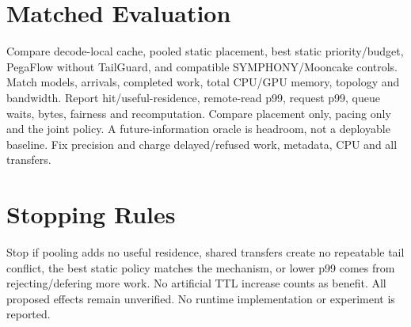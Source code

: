 \documentclass[conference]{IEEEtran}
\begin{document}
\section{Matched Evaluation}
Compare decode-local cache, pooled static placement, best static priority/budget, PegaFlow without TailGuard, and compatible SYMPHONY/Mooncake controls. Match models, arrivals, completed work, total CPU/GPU memory, topology and bandwidth. Report hit/useful-residence, remote-read p99, request p99, queue waits, bytes, fairness and recomputation. Compare placement only, pacing only and the joint policy. A future-information oracle is headroom, not a deployable baseline. Fix precision and charge delayed/refused work, metadata, CPU and all transfers.
\section{Stopping Rules}
Stop if pooling adds no useful residence, shared transfers create no repeatable tail conflict, the best static policy matches the mechanism, or lower p99 comes from rejecting/defering more work. No artificial TTL increase counts as benefit. All proposed effects remain unverified. No runtime implementation or experiment is reported.


\end{document}
